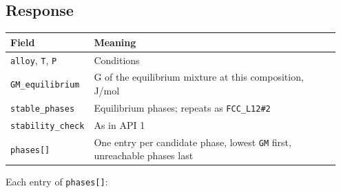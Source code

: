 \documentclass[12pt,a4paper]{article}
\begin{document}
\subsection*{Response}
\begingroup\small
\begin{longtable}{>{\raggedright\arraybackslash}p{0.193\linewidth}>{\raggedright\arraybackslash}p{0.754\linewidth}}
\toprule
\textbf{Field} & \textbf{Meaning} \\
\midrule
\endhead
\texttt{alloy}, \texttt{T}, \texttt{P} & Conditions \\
\texttt{GM\_\allowbreak{}equilibrium} & G of the equilibrium mixture at this composition, J/mol \\
\texttt{stable\_\allowbreak{}phases} & Equilibrium phases; repeats as \texttt{\textquotedbl{}FCC\_\allowbreak{}L12\#2\textquotedbl{}} \\
\texttt{stability\_\allowbreak{}check} & As in API 1 \\
\texttt{phases[]} & One entry per candidate phase, lowest \texttt{GM} first, unreachable phases last \\
\bottomrule
\end{longtable}
\endgroup
Each entry of \texttt{phases[]}:
\end{document}
